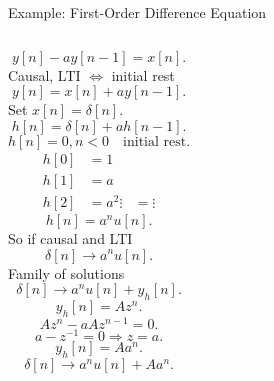 \begin{frame}{Example: First-Order Difference Equation}
    \begin{columns}
        \begin{equation*}
            y[n]  - ay[n-1] = x[n].
        \end{equation*}
        Causal, LTI $\Longleftrightarrow$ initial rest\\
        \begin{equation*}
            y[n]  =  x[n] + ay[n-1].
        \end{equation*}
        Set $x[n] = \delta[n]$.
        \begin{equation*}
            h[n] = \delta[n] + ah[n-1].
        \end{equation*}
        \pause
        \begin{equation*}
            h[n] = 0, n < 0\quad \text{initial rest}.
        \end{equation*}
        \begin{align*}
          h[0] &= 1 \\
          h[1] &= a\\
          h[2] &= a^2
          \vdots &= \vdots
        \end{align*}
        \begin{equation*}
            h[n] = a^nu[n].
        \end{equation*}
        So if causal and LTI
        \begin{equation*}
            \delta[n] \rightarrow a^nu[n].
        \end{equation*}
        Family of solutions
        \begin{equation*}
            \delta[n] \rightarrow a^nu[n] + y_h[n].
        \end{equation*}
        \begin{equation*}
            y_h[n] =  Az^n.
        \end{equation*}
        \begin{equation*}
            Az^n - aAz^{n-1} = 0.
        \end{equation*}
        \begin{equation*}
            a - z^{-1} = 0 \Rightarrow z = a.
        \end{equation*}
        \begin{equation*}
            y_h[n] =  Aa^n.
        \end{equation*}
        \begin{equation*}
            \delta[n] \rightarrow a^nu[n] + Aa^n.
        \end{equation*}
    \end{columns}
\end{frame}


